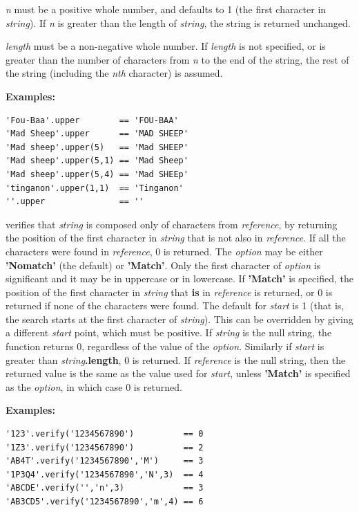 \begin{description}
\emph{n} must be a positive whole number, and defaults to 1 (the
first character in \emph{string}).  If \emph{n} is greater than
the length of \emph{string}, the string is returned unchanged.
 
\emph{length} must be a non-negative whole number.
If \emph{length} is not specified, or is greater than the number of
characters from \emph{n} to the end of the string, the rest of the
string (including the \emph{n}\emph{th} character) is assumed.
 
\textbf{Examples:}
\begin{lstlisting}
'Fou-Baa'.upper        == 'FOU-BAA'
'Mad Sheep'.upper      == 'MAD SHEEP'
'Mad sheep'.upper(5)   == 'Mad SHEEP'
'Mad sheep'.upper(5,1) == 'Mad Sheep'
'Mad sheep'.upper(5,4) == 'Mad SHEEp'
'tinganon'.upper(1,1)  == 'Tinganon'
''.upper               == ''
\end{lstlisting}

\item[verify(reference [,option [,start{]]})]\label{refverify}
verifies that \emph{string} is composed only of characters
from \emph{reference}, by returning the position of the first
character in \emph{string} that is not also in
\emph{reference}.  If all the characters were found in
\emph{reference}, 0 is returned.
 The \emph{option} may be either \textbf{'Nomatch'} (the
default) or \textbf{'Match'}.  Only the first character of
\emph{option} is significant and it may be in uppercase or in
lowercase.
If \textbf{'Match'} is specified, the position of the first character
in \emph{string} that \textbf{is} in \emph{reference} is
returned, or 0 is returned if none of the characters were found.
 The default for \emph{start} is 1 (that is, the search starts at
the first character of \emph{string}).
This can be overridden by giving a different \emph{start} point,
which must be positive.
 If \emph{string} is the null string, the function returns 0,
regardless of the value of the \emph{option}.
Similarly if \emph{start} is greater than
\emph{string}\textbf{.length}, 0 is returned.
 If \emph{reference} is the null string, then the returned value
is the same as the value used for \emph{start},
unless \textbf{'Match'} is specified as the \emph{option}, in
which case 0 is returned.
 
\textbf{Examples:}
\begin{lstlisting}
'123'.verify('1234567890')          == 0
'1Z3'.verify('1234567890')          == 2
'AB4T'.verify('1234567890','M')     == 3
'1P3Q4'.verify('1234567890','N',3)  == 4
'ABCDE'.verify('','n',3)            == 3
'AB3CD5'.verify('1234567890','m',4) == 6
\end{lstlisting}


\end{description}
